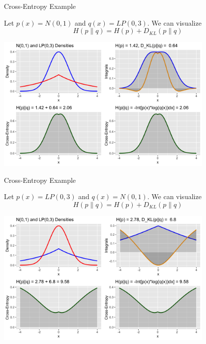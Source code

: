 \documentclass[11pt,compress,t,notes=noshow, xcolor=table]{beamer}
\begin{document}
\begin{vbframe} {Cross-Entropy Example}

Let $p(x)=N(0,1)$ and $q(x)=LP(0, 3)$. We can visualize 
$$
H(p \| q) = H(p) + D_{KL}(p \| q)
$$
\begin{center}
    \includegraphics[width = 0.8\textwidth]{figure/cross_entropy_plot_1.png}
\end{center}

\end{vbframe}

\begin{vbframe} {Cross-Entropy Example}

Let $p(x)=LP(0, 3)$ and $q(x)=N(0,1)$. We can visualize 
$$
H(p \| q) = H(p) + D_{KL}(p \| q)
$$

\begin{center}
	\includegraphics[width = 0.8\textwidth]{figure/cross_entropy_plot_2.png}
\end{center}

\end{vbframe}
 
\end{document}
